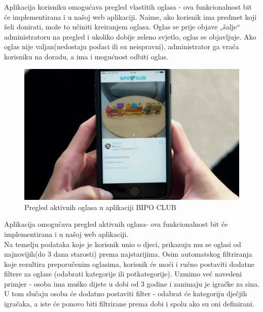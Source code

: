 		\newline
		Aplikacija korisniku omogućava pregled vlastitih oglasa - ova funkcionalnost bit će implementirana i u našoj web aplikaciji. Naime, ako korisnik ima predmet koji želi donirati, može to učiniti kreiranjem oglasa. Oglas se prije objave „šalje“ administratoru na pregled i ukoliko dobije zeleno svjetlo, oglas se objavljuje. Ako oglas nije valjan(nedostaju podaci ili su neispravni), administrator ga vraća korisniku na doradu, a ima i mogućnost odbiti oglas.\\
		\newline
		\begin{figure}[h!]
			\center
			\includegraphics[height=0.15\textheight]{./slike/Picture4.png}
			\caption{ Pregled aktivnih oglasa u aplikaciji BIPO CLUB}
			\label{fig4}
		\end{figure}
		\newline
		Aplikacija omogućava pregled aktivnih oglasa- ova funkcionalnost bit će implementirana i u našoj web aplikaciji. \\
		\newline
		Na temelju podataka koje je korisnik unio o djeci, prikazuju mu se oglasi od najnovijih(do 3 dana starosti) prema najstarijima. Osim automatskog filtriranja koje rezultira preporučenim oglasima, korisnik će moći i ručno postaviti dodatne filtere za oglase (odabrati kategorije ili potkategorije). Uzmimo već navedeni primjer - osoba ima muško dijete u dobi od 3 godine i zanimaju je igračke za sina. U tom slučaju osoba će dodatno postaviti filter - odabrat će kategoriju dječjih igračaka, a iste će ponovo biti filtrirane prema dobi i spolu ako su oni definirani. \\
		\newline
